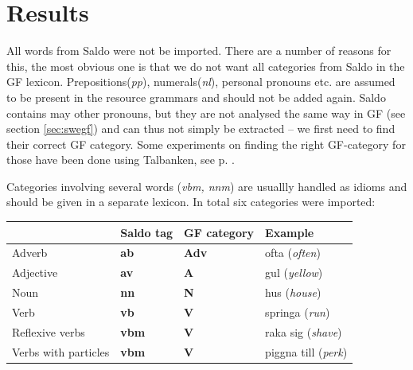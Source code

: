 \documentclass{report}
\begin{document}
\section{Results}
All words from Saldo were not be imported. There are a number of reasons
for this, the most obvious one is that we do not want all categories from
Saldo in the GF lexicon. Prepositions(\emph{pp}), numerals(\emph{nl}),
personal pronouns etc.
are assumed to be present in the resource grammars and should not be added again.
Saldo contains may other pronouns,
but they are not analysed the same way in GF (see section \ref{sec:swegf}) and
can thus not simply be extracted -- we first need to find their correct GF category.
Some experiments on finding
the right GF-category for those have been done using Talbanken, see p. \pageref{sec:gf.quant}.

Categories involving several words (\emph{vbm, nnm})
are usuallly handled as idioms and should be given in a separate lexicon. In
total six categories were imported: \\

\begin{tabular}{|l|lll|}
\hline
& Saldo tag & GF category & Example \\
\hline
 Adverb & \textbf{ab} &\textbf{Adv} & ofta (\emph{often})\\
 Adjective&\textbf{av} &    \textbf{A} & gul (\emph{yellow})\\
 Noun & \textbf{nn} &\textbf{N} & hus (\emph{house})\\
 Verb & \textbf{vb} &\textbf{V} & springa (\emph{run})\\
 Reflexive verbs  &\textbf{vbm}& \textbf{V} & raka sig (\emph{shave})\\
 Verbs with particles &\textbf{vbm}& \textbf{V}  &  piggna till (\emph{perk})\\
\hline
\end{tabular}\\
\end{document}
